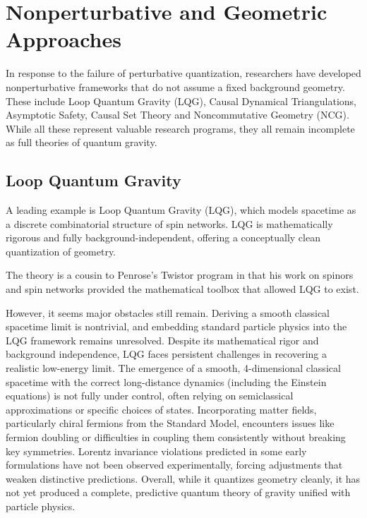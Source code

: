 \section{Nonperturbative and Geometric Approaches}

In response to the failure of perturbative quantization, researchers have developed nonperturbative frameworks that do not assume a fixed background geometry. These include Loop Quantum Gravity (LQG), Causal Dynamical Triangulations, Asymptotic Safety, Causal Set Theory and Noncommutative Geometry (NCG). While all these represent valuable research programs, they all remain incomplete as full theories of quantum gravity.


\subsection*{Loop Quantum Gravity}

A leading example is Loop Quantum Gravity (LQG), which models spacetime as a discrete combinatorial structure of spin networks. LQG is mathematically rigorous and fully background-independent, offering a conceptually clean quantization of geometry.

The theory is a cousin to Penrose’s Twistor program in that his work on spinors and spin networks provided the mathematical toolbox that allowed LQG to exist.

However, it seems major obstacles still remain. Deriving a smooth classical spacetime limit is nontrivial, and embedding standard particle physics into the LQG framework remains unresolved.
Despite its mathematical rigor and background independence, LQG faces persistent challenges in recovering a realistic low-energy limit. The emergence of a smooth, 4-dimensional classical spacetime with the correct long-distance dynamics (including the Einstein equations) is not fully under control, often relying on semiclassical approximations or specific choices of states. Incorporating matter fields, particularly chiral fermions from the Standard Model, encounters issues like fermion doubling or difficulties in coupling them consistently without breaking key symmetries. Lorentz invariance violations predicted in some early formulations have not been observed experimentally, forcing adjustments that weaken distinctive predictions. Overall, while it quantizes geometry cleanly, it has not yet produced a complete, predictive quantum theory of gravity unified with particle physics.



